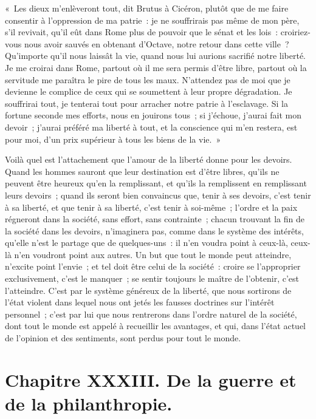 \documentclass[french,twoside]{book} %
\newcommand\chapteropen{} %
\newcommand\chapterclose{} %
\begin{document}
« Les dieux m’enlèveront tout, dit Brutus à Cicéron, plutôt que de me faire consentir à l’oppression de ma patrie : je ne souffrirais pas même de mon père, s’il revivait, qu’il eût dans Rome plus de pouvoir que le sénat et les lois : croiriez-vous nous avoir sauvés en obtenant d’Octave, notre retour dans cette ville ? Qu’importe qu’il nous laissât la vie, quand nous lui aurions sacrifié notre liberté. Je me croirai dans Rome, partout où il me sera permis d’être libre, partout où la servitude me paraîtra le pire de tous les maux. N’attendez pas de moi que je devienne le complice de ceux qui se soumettent à leur propre dégradation. Je souffrirai tout, je tenterai tout pour arracher notre patrie à l’esclavage. Si la fortune seconde mes efforts, nous en jouirons tous ; si j’échoue, j’aurai fait mon devoir ; j’aurai préféré ma liberté à tout, et la conscience qui m’en restera, est pour moi, d’un prix supérieur à tous les biens de la vie. »\par
Voilà quel est l’attachement que l’amour de la liberté donne pour les devoirs. Quand les hommes sauront que leur destination est d’être libres, qu’ils ne peuvent être heureux qu’en la remplissant, et qu’ils la remplissent en remplissant leurs devoirs ; quand ils seront bien convaincus que, tenir à ses devoirs, c’est tenir à sa liberté, et que tenir à sa liberté, c’est tenir à soi-même ; l’ordre et la paix régneront dans la société, sans effort, sans contrainte ; chacun trouvant la fin de la société dans les devoirs, n’imaginera pas, comme dans le système des intérêts, qu’elle n’est le partage que de quelques-uns : il n’en voudra point à ceux-là, ceux-là n’en voudront point aux autres. Un but que tout le monde peut atteindre, n’excite point l’envie ; et tel doit être celui de la société : croire se l’approprier exclusivement, c’est le manquer ; se sentir toujours le maître de l’obtenir, c’est l’atteindre. C’est par le système généreux de la liberté, que nous sortirons de l’état violent dans lequel nous ont jetés les fausses doctrines sur l’intérêt personnel ; c’est par lui que nous rentrerons dans l’ordre naturel de la société, dont tout le monde est appelé à recueillir les avantages, et qui, dans l’état actuel de l’opinion et des sentiments, sont perdus pour tout le monde.
\chapterclose


\chapteropen
\chapter[{Chapitre XXXIII. De la guerre et de la philanthropie.}]{Chapitre XXXIII. De la guerre et de la philanthropie.}\renewcommand{\leftmark}{Chapitre XXXIII. De la guerre et de la philanthropie.}
\end{document}
